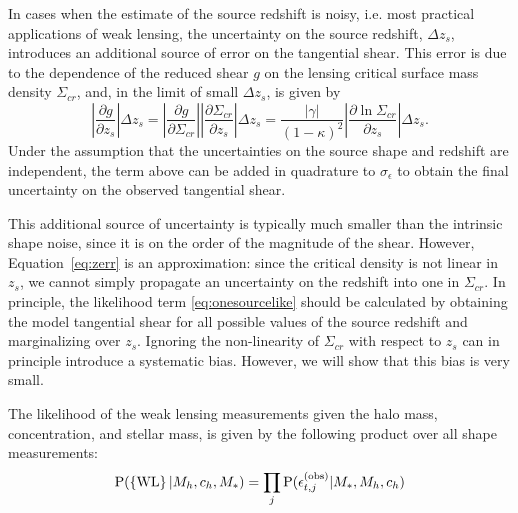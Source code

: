 \documentclass[usenatbib]{mnras}
\def\mstar{M_*}
\def\mhalo{M_{h}}
\def\chalo{c_{h}}
\def\sigmaeps{\sigma_\epsilon}
\def\epsobsj{\epsilon_{t, j}^{(\mathrm{obs})}}
\def\wl{\left\{\rm{WL}\right\}}
\def\Eref#1{Equation~\ref{#1}\xspace}
\def\pr{{\rm P}}
\begin{document}
In cases when the estimate of the source redshift is noisy, i.e. most practical applications of weak lensing, the uncertainty on the source redshift, $\Delta z_s$, introduces an additional source of error on the tangential shear.
This error is due to the dependence of the reduced shear $g$ on the lensing critical surface mass density $\Sigma_{cr}$, and, in the limit of small $\Delta z_s$, is given by
\begin{equation}\label{eq:zerr}
\left|\frac{\partial g}{\partial z_s}\right| \Delta z_s = \left|\frac{\partial g}{\partial \Sigma_{cr}}\right| \left|\frac{\partial \Sigma_{cr}}{\partial z_s}\right| \Delta z_s = \frac{|\gamma|}{(1-\kappa)^2} \left|\frac{\partial \ln{\Sigma_{cr}}}{\partial z_s}\right| \Delta z_s.
\end{equation}
Under the assumption that the uncertainties on the source shape and redshift are independent, the term above can be added in quadrature to $\sigmaeps$ to obtain the final uncertainty on the observed tangential shear.

This additional source of uncertainty is typically much smaller than the intrinsic shape noise, since it is on the order of the magnitude of the shear.
However, \Eref{eq:zerr} is an approximation: since the critical density is not linear in $z_s$, we cannot simply propagate an uncertainty on the redshift into one in $\Sigma_{cr}$. In principle, the likelihood term \ref{eq:onesourcelike} should be calculated by obtaining the model tangential shear for all possible values of the source redshift and marginalizing over $z_s$. Ignoring the non-linearity of $\Sigma_{cr}$ with respect to $z_s$ can in principle introduce a systematic bias. However, we will show that this bias is very small. 

The likelihood of the weak lensing measurements given the halo mass, concentration, and stellar mass, is given by the following product over all shape measurements:
%
\begin{equation}
\pr(\wl | \mhalo, \chalo, \mstar) = \prod_j \pr(\epsobsj | \mstar, \mhalo, \chalo) 
\end{equation}
\end{document}
